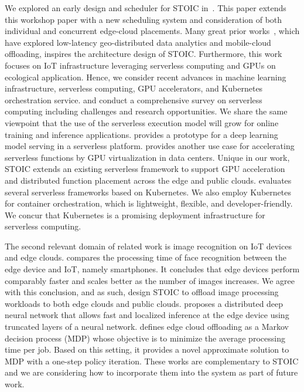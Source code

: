 We explored an early design and scheduler for STOIC in~\cite{ref:stoic2020}.  This paper extends this workshop paper with a new scheduling system and consideration of both individual and concurrent edge-cloud placements. Many great prior works~\cite{ref:lowlatency, ref:bandwidth, ref:MAUI}, which have explored low-latency geo-distributed data analytics and mobile-cloud offloading, inspires the architecture design of STOIC. Furthermore, this work focuses on IoT infrastructure leveraging serverless computing and GPUs on ecological application. Hence, we consider recent advances in machine learning infrastructure, serverless computing, GPU accelerators, and Kubernetes orchestration service. \cite{ref:serverlessstep} and \cite{ref:berkeleyserverless} conduct a comprehensive survey on serverless computing including challenges and research opportunities. We share the same viewpoint that the use of the serverless execution model will grow for online training and inference applications. \cite{ref:deepserving} provides a prototype for a deep learning model serving in a serverless platform. \cite{ref:accelerated} provides another use case for accelerating serverless functions by GPU virtualization in data centers. Unique in our work, STOIC extends an existing serverless framework to support GPU acceleration and distributed function placement across the edge and public clouds. \cite{ref:evaluation} evaluates several serverless frameworks based on Kubernetes. We also employ Kubernetes for container orchestration, which is lightweight, flexible, and developer-friendly.  We concur that Kubernetes is a promising deployment infrastructure for serverless computing.  

The second relevant domain of related work is image recognition on IoT devices and edge clouds. \cite{ref:face} compares the processing time of face recognition between the edge device and IoT, namely smartphones. It concludes that edge devices perform comparably faster and scales better as the number of images increases. We agree with this conclusion, and as such, design STOIC to offload image processing workloads to both edge clouds and public clouds. \cite{ref:DDNN} proposes a distributed deep neural network that allows fast and localized inference at the edge device using truncated layers of a neural network. \cite{ref:cooperative} defines edge cloud offloading as a Markov decision process (MDP) whose objective is to minimize the average processing time per job. Based on this setting, it provides a novel approximate solution to MDP with a one-step policy iteration. These works are complementary to STOIC and we are considering how to incorporate them into the system as part of future work.


